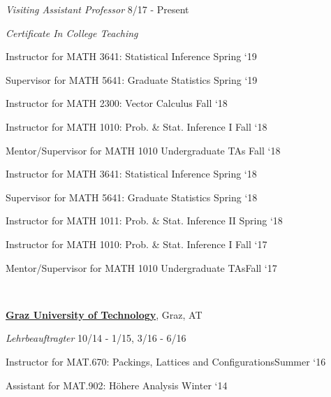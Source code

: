 \documentclass[10pt]{article}
\newlength{\footpageshift}
\newenvironment{outerlist}[1][\enskip\textbullet]%
        {\begin{itemize}[#1]}{\end{itemize}%
         \vspace{-.6\baselineskip}}
\newenvironment{innerlist}[1][\enskip\textbullet]%
        {\begin{compactitem}[#1]}{\end{compactitem}}
\begin{document}
\begin{outerlist}
\item[] \textit{Visiting Assistant Professor}%
\hspace{\footpageshift}\textrm{8/17 - Present}
\vspace{-.5em}
\item[] \textit{Certificate In College Teaching}
    \begin{innerlist}[-]
       \item Instructor for MATH 3641: Statistical Inference \hfill Spring `19
              \item Supervisor for MATH 5641: Graduate Statistics \hfill Spring `19
     \item Instructor for MATH 2300: Vector Calculus \hfill Fall `18
     \item Instructor for MATH 1010:  Prob. \& Stat. Inference I \hfill Fall `18
          \item Mentor/Supervisor for MATH 1010 Undergraduate TAs \hfill Fall `18
      \item Instructor for MATH 3641:  Statistical Inference \hfill Spring `18
                    \item Supervisor for MATH 5641: Graduate Statistics \hfill Spring `18
      \item Instructor for MATH 1011:  Prob. \& Stat. Inference II \hfill Spring `18
     \item Instructor for MATH 1010:  Prob. \& Stat. Inference I \hfill Fall `17
     \item Mentor/Supervisor for MATH 1010 Undergraduate TAs\hfill Fall `17
       \end{innerlist}~
\end{outerlist}



%
\href{http://www.tugraz.at}{\textbf{Graz University of Technology}},
Graz, AT
%
\begin{outerlist}
\item[] \textit{Lehrbeauftragter}%
\hspace{\footpageshift}\textrm{10/14 - 1/15, 3/16 - 6/16} %
    \begin{innerlist}[-]
     \item Instructor for MAT.670:  Packings, Lattices and Configurations\hfill Summer `16
     \item Assistant for MAT.902: H\"ohere Analysis   \hfill Winter `14 
    \end{innerlist}~
\end{outerlist}
\end{document}
